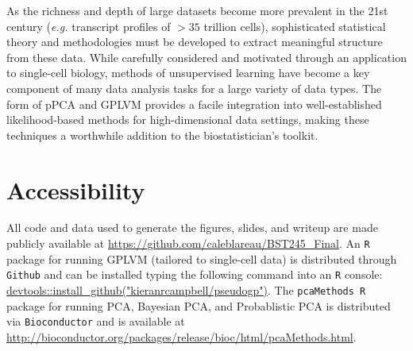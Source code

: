 \documentclass[english, 11pt]{article}\usepackage[]{graphicx}\usepackage[]{color}
\begin{document}
\newline \newline
As the richness and depth of large datasets become more prevalent in the 21st century (\textit{e.g.} transcript profiles of $> 35$ trillion cells), sophisticated statistical theory and methodologies must be developed to extract meaningful structure from these data. While carefully considered and motivated through an application to single-cell biology, methods of unsupervised learning have become a key component of many data analysis tasks for a large variety of data types. The form of pPCA and GPLVM provides a facile integration into well-established likelihood-based methods for high-dimensional data settings, making these techniques a worthwhile addition to the biostatistician's toolkit.


\section*{Accessibility}

All code and data used to generate the figures, slides, and writeup are made publicly available at \url{https://github.com/caleblareau/BST245_Final}. An \texttt{R} package for running GPLVM (tailored to single-cell data) is distributed through \texttt{Github} and can be installed typing the following command into an \texttt{R} console: \url{devtools::install_github("kieranrcampbell/pseudogp")}.  The \texttt{pcaMethods R} package for running PCA, Bayesian PCA, and Probablistic PCA is distributed via \texttt{Bioconductor} and is available at \url{http://bioconductor.org/packages/release/bioc/html/pcaMethods.html}.

\newpage{}



{}
\end{document}
